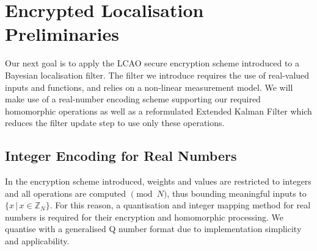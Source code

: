 \documentclass[twocolumn]{autart}
\begin{document}
% 
%                                                                                                     
%                                                                                                     
%                                                                                                     
% 

\section{Encrypted Localisation Preliminaries} \label{sec:loc_prelim}
Our next goal is to apply the LCAO secure encryption scheme introduced to a Bayesian localisation filter. The filter we introduce requires the use of real-valued inputs and functions, and relies on a non-linear measurement model. We will make use of a real-number encoding scheme supporting our required homomorphic operations as well as a reformulated Extended Kalman Filter which reduces the filter update step to use only these operations.

% 
% 

\subsection{Integer Encoding for Real Numbers} \label{subsec:encoding}
In the encryption scheme introduced, weights and values are restricted to integers and all operations are computed $\pmod{N}$, thus bounding meaningful inputs to $\{x \,|\, x \in \mathbb{Z}_N\}$. For this reason, a quantisation and integer mapping method for real numbers is required for their encryption and homomorphic processing. We quantise with a generalised Q number format \cite{oberstarFixedPointRepresentationFractional2007} due to implementation simplicity and applicability.
\end{document}

